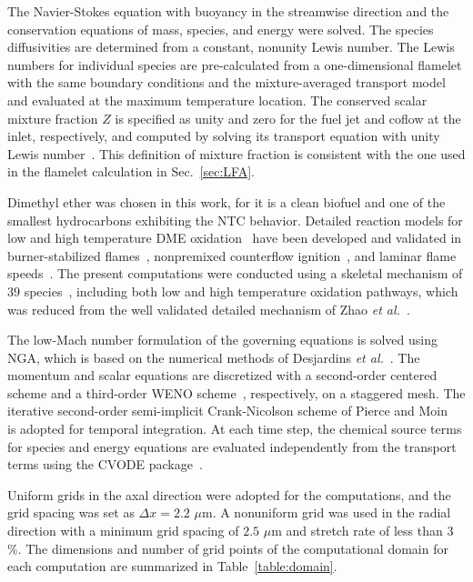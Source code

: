 \documentclass[review,3p,times]{elsarticle}
\begin{document}
The Navier-Stokes equation with buoyancy in the streamwise direction and the conservation equations of mass, species, and energy were solved.  The species diffusivities are determined from a constant, nonunity Lewis number.  The Lewis numbers for individual species are pre-calculated from a one-dimensional flamelet with the same boundary conditions and the mixture-averaged transport model and evaluated at the maximum temperature location.  The conserved scalar mixture fraction $Z$ is specified as unity and zero for the fuel jet and coflow at the inlet, respectively, and computed by solving its transport equation with unity Lewis number~\cite{pitsch98b}.  This definition of mixture fraction is consistent with the one used in the flamelet calculation in Sec.~\ref{sec:LFA}.

Dimethyl ether was chosen in this work, for it is a clean biofuel and one of the smallest hydrocarbons exhibiting the NTC behavior. Detailed reaction models for low and high temperature DME oxidation~\cite{curran98,fischer00,curran00,zhao08} have been developed and validated in burner-stabilized flames~\cite{kaiser00}, nonpremixed counterflow ignition~\cite{zheng05}, and laminar flame speeds~\cite{qin05}.  The present computations were conducted using a skeletal mechanism of $39$ species~\cite{bansal11}, including both low and high temperature oxidation pathways, which was reduced from the well validated detailed mechanism of Zhao \emph{et al.}~\cite{zhao08}. 

The low-Mach number formulation of the governing equations is solved using NGA, which is based on the numerical methods of Desjardins \emph{et al.}~\cite{desjardins08}.  The momentum and scalar equations are discretized with a second-order centered scheme and a third-order WENO scheme~\cite{liu94}, respectively, on a staggered mesh.  The iterative second-order semi-implicit Crank-Nicolson scheme of Pierce and Moin~\cite{pierce01} is adopted for temporal integration.  At each time step, the chemical source terms for species and energy equations are evaluated independently from the transport terms using the CVODE package~\cite{cohen96}.

Uniform grids in the axal direction were adopted for the computations, and the grid spacing was set as $\Delta x = 2.2$ $\mu$m.  A nonuniform grid was used in the radial direction with a minimum grid spacing of $2.5$ $\mu$m and stretch rate of less than $3$\%.  The dimensions and number of grid points of the computational domain for each computation are summarized in Table~\ref{table:domain}.
\end{document}
